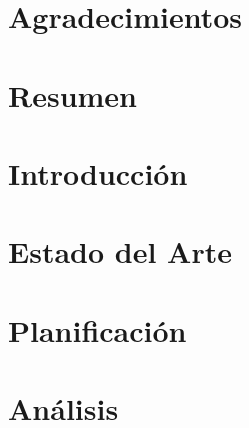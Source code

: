 \documentclass[a4paper, 11pt, oneside]{memoir}
\title{\izenburua}
\author{\egilea}
\date{\data}
\begin{document}

% 


\cleardoublepage
\frontmatter


\chapter*{Agradecimientos}

\cleardoublepage


\chapter*{Resumen}

\cleardoublepage


\tableofcontents
\clearpage
\listoffigures
\clearpage
\listoftables
\clearpage


\cleardoublepage
\mainmatter
\pagestyle{ruled}

\chapter{Introducción} \label{ch:introduccion}

\cleardoublepage

\chapter{Estado del Arte} \label{ch:estadoDelArte}

\cleardoublepage

\chapter{Planificación} \label{ch:planificacion}

\cleardoublepage

\chapter{Análisis} \label{ch:analisis}

\cleardoublepage
\end{document}
